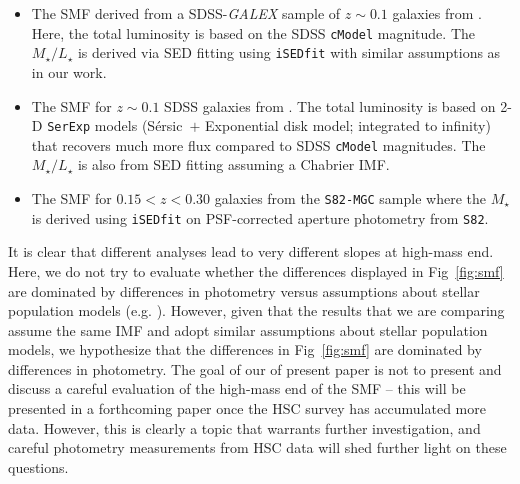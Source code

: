 \documentclass[a4paper,fleqn,usenatbib]{mnras}
\def\ser{{S\'{e}rsic\ }}
\def\cmodel{\texttt{cModel}}
\def\mstar{{$M_{\star}$}}
\def\m2l{{$M_{\star}/L_{\star}$}}
\begin{document}
    \begin{itemize}
    
        \item The SMF derived from a SDSS-\textit{GALEX} sample of $z{\sim} 0.1$ 
            galaxies from \citet{Moustakas13}. 
            Here, the total luminosity is based on the SDSS \cmodel{} magnitude. 
            The \m2l{} is derived via SED fitting using \texttt{iSEDfit} with similar 
            assumptions as in our work.
            
        \item The SMF for $z{\sim} 0.1$ SDSS galaxies from \citet{Bernardi2013}. 
            The total luminosity is based on 2-D \texttt{SerExp} models 
            (\ser{}$+$ Exponential disk model; integrated to infinity) that 
            recovers much more flux compared to SDSS \cmodel{} magnitudes. 
            The \m2l{} is also from SED fitting assuming a Chabrier IMF.
            
        \item The SMF for $0.15 < z < 0.30$ galaxies from the \texttt{S82-MGC} sample
            \citep{Leauthaud2016} where the \mstar{} is derived using 
            \texttt{iSEDfit} on PSF-corrected aperture photometry from 
            \texttt{S82}.
            
    \end{itemize}

    It is clear that different analyses lead to very different slopes at high-mass end. 
    Here, we do not try to evaluate whether the differences displayed in 
    Fig~\ref{fig:smf} are dominated by differences in photometry versus 
    assumptions about stellar population models (e.g. \citealt{Bernardi2017}). 
    However, given that the results that we are comparing assume the same IMF and adopt 
    similar assumptions about stellar population models, we hypothesize that the 
    differences in Fig~\ref{fig:smf} are dominated by differences in photometry. 
    The goal of our of present paper is not to present and discuss a careful evaluation
    of the high-mass end of the SMF -- this will be presented in a forthcoming paper 
    once the HSC survey has accumulated more data. 
    However, this is clearly a topic that warrants further investigation, and careful 
    photometry measurements from HSC data will shed further light on these questions.     
      
\end{document}
